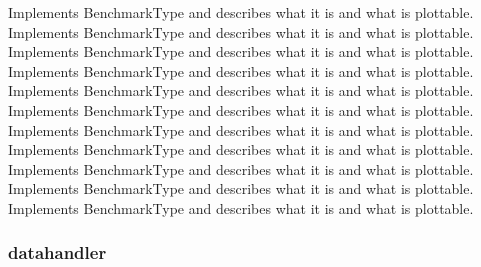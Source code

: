 {Implements BenchmarkType and describes what it is and what is plottable.}
{}{}
{Implements BenchmarkType and describes what it is and what is plottable.}
{}{}
{Implements BenchmarkType and describes what it is and what is plottable.}
{}{}
{Implements BenchmarkType and describes what it is and what is plottable.}
{}{}
{Implements BenchmarkType and describes what it is and what is plottable.}
{}{}
{Implements BenchmarkType and describes what it is and what is plottable.}
{}{}
{Implements BenchmarkType and describes what it is and what is plottable.}
{}{}
{Implements BenchmarkType and describes what it is and what is plottable.}
{}{}
{Implements BenchmarkType and describes what it is and what is plottable.}
{}{}
{Implements BenchmarkType and describes what it is and what is plottable.}
{}{}
{Implements BenchmarkType and describes what it is and what is plottable.}
{}{}


\subsubsection{datahandler}


